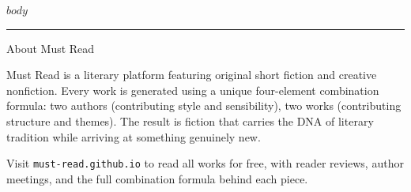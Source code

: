 \documentclass[11pt,twoside,openany]{book}
\let\oldrule\rule
\begin{document}
\pagestyle{main}

$body$

\clearpage
\thispagestyle{plain}
\begin{center}
  \vspace*{3em}
  \textcolor{goldenrod}{\oldrule{3cm}{0.4pt}}
  \vspace{1em}

  {\displayfont\large About Must Read}

  \vspace{1em}
\end{center}

{\small
Must Read is a literary platform featuring original short fiction and creative nonfiction.
Every work is generated using a unique four-element combination formula: two authors
(contributing style and sensibility), two works (contributing structure and themes).
The result is fiction that carries the DNA of literary tradition while arriving at
something genuinely new.

\vspace{1em}
Visit \texttt{must-read.github.io} to read all works for free, with reader reviews,
author meetings, and the full combination formula behind each piece.
}
\end{document}
